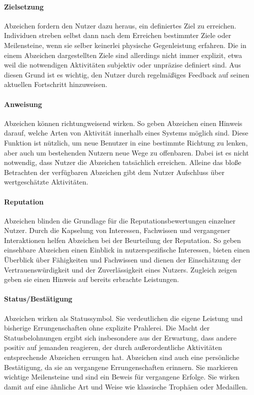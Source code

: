 \paragraph{Zielsetzung}
Abzeichen fordern den Nutzer dazu heraus, ein definiertes Ziel zu erreichen. Individuen streben selbst dann nach dem Erreichen bestimmter Ziele oder Meilensteine, wenn sie selber keinerlei physische Gegenleistung erfahren. Die in einem Abzeichen dargestellten Ziele sind allerdings nicht immer explizit, etwa weil die notwendigen Aktivitäten subjektiv oder unpräzise definiert sind. Aus diesen Grund ist es wichtig, den Nutzer durch regelmäßiges Feedback auf seinen aktuellen Fortschritt hinzuweisen. 

\paragraph{Anweisung}
Abzeichen können richtungweisend wirken. So geben Abzeichen einen Hinweis darauf, welche Arten von Aktivität innerhalb eines Systems möglich sind. Diese Funktion ist nützlich, um neue Benutzer in eine bestimmte Richtung zu lenken, aber auch um bestehenden Nutzern neue Wege zu offenbaren. Dabei ist es nicht notwendig, dass Nutzer die Abzeichen tatsächlich erreichen. Alleine das bloße Betrachten der verfügbaren Abzeichen gibt dem Nutzer Aufschluss über wertgeschätzte Aktivitäten.

\paragraph{Reputation}
Abzeichen blinden die Grundlage für die Reputationsbewertungen einzelner Nutzer. Durch die Kapselung von Interessen, Fachwissen und vergangener Interaktionen helfen Abzeichen bei der Beurteilung der Reputation. So geben einsehbare Abzeichen einen Einblick in nutzerspezifische Interessen, bieten einen Überblick über Fähigkeiten und Fachwissen und dienen der Einschätzung der Vertrauenswürdigkeit und der Zuverlässigkeit eines Nutzers. Zugleich zeigen geben sie einen Hinweis auf bereits erbrachte Leistungen.

\paragraph{Status/Bestätigung}
Abzeichen wirken als Statussymbol. Sie verdeutlichen die eigene Leistung und bisherige Errungenschaften ohne explizite Prahlerei.
Die Macht der Statusbelohnungen ergibt sich insbesondere aus der Erwartung, dass andere positiv auf jemanden reagieren, der durch außerordentliche Aktivitäten entsprechende Abzeichen errungen hat. Abzeichen sind auch eine persönliche Bestätigung, da sie an vergangene Errungenschaften erinnern. Sie markieren wichtige Meilensteine und sind ein Beweis für vergangene Erfolge. Sie wirken damit auf eine ähnliche Art und Weise wie klassische Trophäen oder Medaillen.

